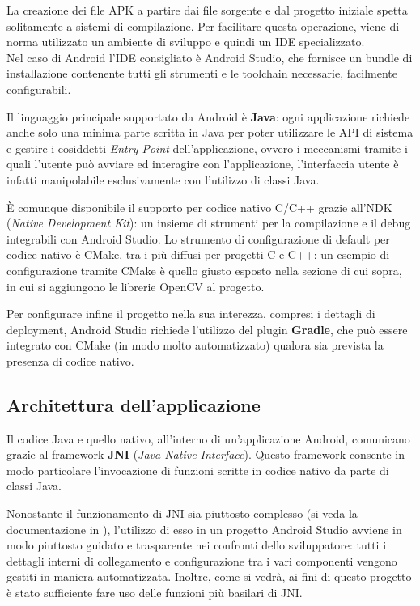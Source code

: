 La creazione dei file APK a partire dai file sorgente e dal progetto iniziale spetta solitamente a sistemi di compilazione.
Per facilitare questa operazione, viene di norma utilizzato un ambiente di sviluppo e quindi un IDE specializzato.\\
Nel caso di Android l'IDE consigliato è Android Studio, che fornisce un bundle di installazione contenente tutti gli strumenti
e le toolchain necessarie, facilmente configurabili.

Il linguaggio principale supportato da Android è \textbf{Java}: ogni applicazione richiede anche solo una minima parte scritta 
in Java per poter utilizzare le API di sistema e gestire i cosiddetti \emph{Entry Point} dell'applicazione, ovvero i meccanismi 
tramite i quali l'utente può avviare ed interagire con l'applicazione, l'interfaccia utente è infatti manipolabile esclusivamente
con l'utilizzo di classi Java.

È comunque disponibile il supporto per codice nativo C/C++ grazie all'NDK (\emph{Native Development Kit}): un insieme di strumenti
per la compilazione e il debug integrabili con Android Studio. Lo strumento di configurazione di default per codice nativo è 
CMake, tra i più diffusi per progetti C e C++: un esempio di configurazione tramite CMake è quello giusto esposto nella
sezione di cui sopra, in cui si aggiungono le librerie OpenCV al progetto.

Per configurare infine il progetto nella sua interezza, compresi i dettagli di deployment, Android Studio richiede l'utilizzo 
del plugin \textbf{Gradle}, che può essere integrato con CMake (in modo molto automatizzato) qualora sia prevista la 
presenza di codice nativo.

\subsection{Architettura dell'applicazione}

Il codice Java e quello nativo, all'interno di un'applicazione Android, comunicano grazie al framework \textbf{JNI} 
(\textit{Java Native Interface}). Questo framework consente in modo particolare l'invocazione di funzioni scritte in codice
nativo da parte di classi Java. 

Nonostante il funzionamento di JNI sia piuttosto complesso (si veda la documentazione in \cite{jnispec}), l'utilizzo di esso 
in un progetto Android Studio avviene in modo piuttosto guidato e trasparente nei confronti dello sviluppatore: tutti i 
dettagli interni di collegamento e configurazione tra i vari componenti vengono gestiti in maniera automatizzata. 
Inoltre, come si vedrà, ai fini di questo progetto è stato sufficiente fare uso delle funzioni più basilari di JNI.

